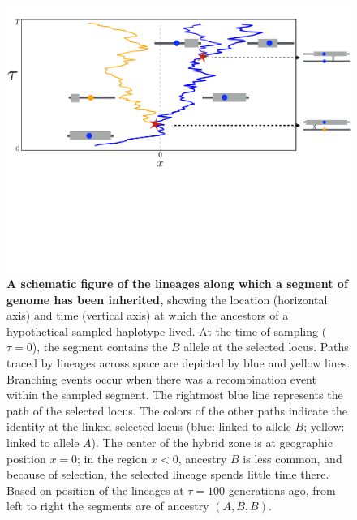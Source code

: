 \documentclass[11pt,letterpaper]{article}
\newcommand{\plr}[1]{{\em \color{blue} #1}}
\begin{document}
\begin{figure}
\includegraphics[clip,width=\textwidth,trim=0cm 8cm 0cm 0.05cm]{figs/BM_schematic_new2.pdf}
\caption{
    \textbf{A schematic figure of the lineages along which a segment of genome has been inherited,}
    showing the location (horizontal axis) and time (vertical axis) at which the ancestors 
    of a hypothetical sampled haplotype lived.
    At the time of sampling ($\tau=0$), the segment contains the $B$ allele at the selected locus.
    Paths traced by lineages across space are depicted by blue and yellow lines. 
    Branching events occur when there was a recombination event within the sampled segment.
    The rightmost blue line represents the path of the selected locus. 
    The colors of the other paths indicate the identity at the linked selected locus 
    (blue: linked to allele $B$; yellow: linked to allele $A$). 
    The center of the hybrid zone is at geographic position $x=0$; in the region $x<0$, ancestry $B$ is less common,
    and because of selection, the selected lineage spends little time there.
    Based on position of the lineages at $\tau=100$ generations ago,
    from left to right the segments are of ancestry $(A,B,B)$.
}\label{Fig:schematic}
\end{figure}
\end{document}
